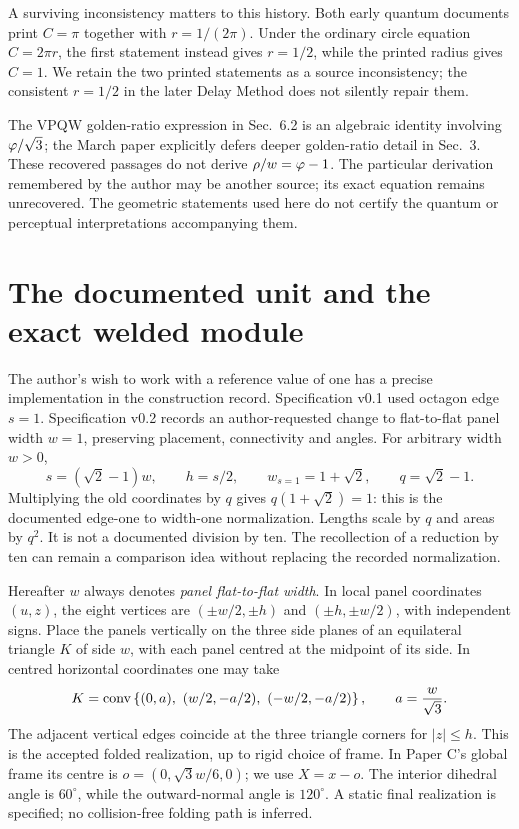 A surviving inconsistency matters to this history. Both early quantum documents print $C=\pi$ together with $r=1/(2\pi)$. Under the ordinary circle equation $C=2\pi r$, the first statement instead gives $r=1/2$, while the printed radius gives $C=1$. We retain the two printed statements as a source inconsistency; the consistent $r=1/2$ in the later Delay Method does not silently repair them.~\cite[Sec.~5.1, pp.~2--3]{VPQW}~\cite[Sec.~2.1, p.~2]{Fractal}

The VPQW golden-ratio expression in Sec.~6.2 is an algebraic identity involving $\varphi/\sqrt3$; the March paper explicitly defers deeper golden-ratio detail in Sec.~3. These recovered passages do not derive $\rho/w=\varphi-1$. The particular derivation remembered by the author may be another source; its exact equation remains unrecovered. The geometric statements used here do not certify the quantum or perceptual interpretations accompanying them.

\section{The documented unit and the exact welded module}
The author's wish to work with a reference value of one has a precise implementation in the construction record. Specification v0.1 used octagon edge $s=1$. Specification v0.2 records an author-requested change to flat-to-flat panel width $w=1$, preserving placement, connectivity and angles. For arbitrary width $w>0$,
\begin{equation}\label{eq:normalization}
s=(\sqrt2-1)w,\qquad h=s/2,\qquad
w_{s=1}=1+\sqrt2,\qquad q=\sqrt2-1.
\end{equation}
Multiplying the old coordinates by $q$ gives $q(1+\sqrt2)=1$: this is the documented edge-one to width-one normalization. Lengths scale by $q$ and areas by $q^2$. It is not a documented division by ten. The recollection of a reduction by ten can remain a comparison idea without replacing the recorded normalization.~\cite{Spec1,Spec2}

Hereafter $w$ always denotes \emph{panel flat-to-flat width}. In local panel coordinates $(u,z)$, the eight vertices are $(\pm w/2,\pm h)$ and $(\pm h,\pm w/2)$, with independent signs. Place the panels vertically on the three side planes of an equilateral triangle $K$ of side $w$, with each panel centred at the midpoint of its side. In centred horizontal coordinates one may take
\begin{equation}\label{eq:triangle}
K=\operatorname{conv}\left\{(0,a),\ (w/2,-a/2),\ (-w/2,-a/2)\right\},
\qquad a=\frac{w}{\sqrt3}.
\end{equation}
The adjacent vertical edges coincide at the three triangle corners for $|z|\leq h$. This is the accepted folded realization, up to rigid choice of frame. In Paper C's global frame its centre is $o=(0,\sqrt3w/6,0)$; we use $X=x-o$. The interior dihedral angle is $60^\circ$, while the outward-normal angle is $120^\circ$. A static final realization is specified; no collision-free folding path is inferred.~\cite[Secs.~2--5, 7]{PC}~\cite[Sec.~2]{SP}

